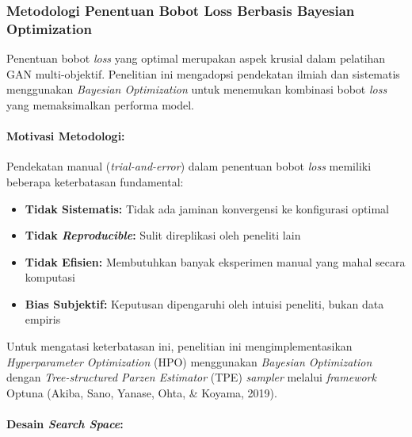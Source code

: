 \documentclass[12pt,a4paper]{article}
\begin{document}
\subsubsection{Metodologi Penentuan Bobot Loss Berbasis Bayesian Optimization}
\label{subsubsec:loss-weight-hpo}

Penentuan bobot \textit{loss} yang optimal merupakan aspek krusial dalam pelatihan GAN multi-objektif. Penelitian ini mengadopsi pendekatan ilmiah dan sistematis menggunakan \textit{Bayesian Optimization} untuk menemukan kombinasi bobot \textit{loss} yang memaksimalkan performa model.

\paragraph{Motivasi Metodologi:}
Pendekatan manual (\textit{trial-and-error}) dalam penentuan bobot \textit{loss} memiliki beberapa keterbatasan fundamental:

\begin{itemize}[leftmargin=*, nosep]
\item \textbf{Tidak Sistematis:} Tidak ada jaminan konvergensi ke konfigurasi optimal
\item \textbf{Tidak \textit{Reproducible}:} Sulit direplikasi oleh peneliti lain
\item \textbf{Tidak Efisien:} Membutuhkan banyak eksperimen manual yang mahal secara komputasi
\item \textbf{Bias Subjektif:} Keputusan dipengaruhi oleh intuisi peneliti, bukan data empiris
\end{itemize}

Untuk mengatasi keterbatasan ini, penelitian ini mengimplementasikan \textit{Hyperparameter Optimization} (HPO) menggunakan \textit{Bayesian Optimization} dengan \textit{Tree-structured Parzen Estimator} (TPE) \textit{sampler} melalui \textit{framework} Optuna (Akiba, Sano, Yanase, Ohta, \& Koyama, 2019).

\paragraph{Desain \textit{Search Space}:}
\end{document}

